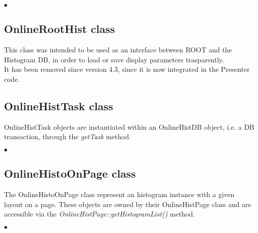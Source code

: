 \documentclass{lhcbnote}
\begin{document}
\begin{list}{$\bullet$}{}

\end{list}

\subsection{OnlineRootHist class}


This class was intended to be used as an interface between ROOT and the
Histogram DB, in
order to load or save display parameters trasparently. \\
It has been removed since version 4.3, since it is now integrated in
the Presenter code.





%


\subsection{OnlineHistTask class}

OnlineHistTask objects are instantiated within an
OnlineHistDB object, i.e. a DB transaction, through the {\it getTask} method.

\begin{list}{$\bullet$}{}

\end{list}


\subsection{OnlineHistoOnPage class}
The OnlineHistoOnPage class represent an histogram instance with a given layout on
a page. These objects are owned by their OnlineHistPage class and are accessible
via the {\it OnlineHistPage::getHistogramList()} method.

\begin{list}{$\bullet$}{}

\end{list}
\end{document}
